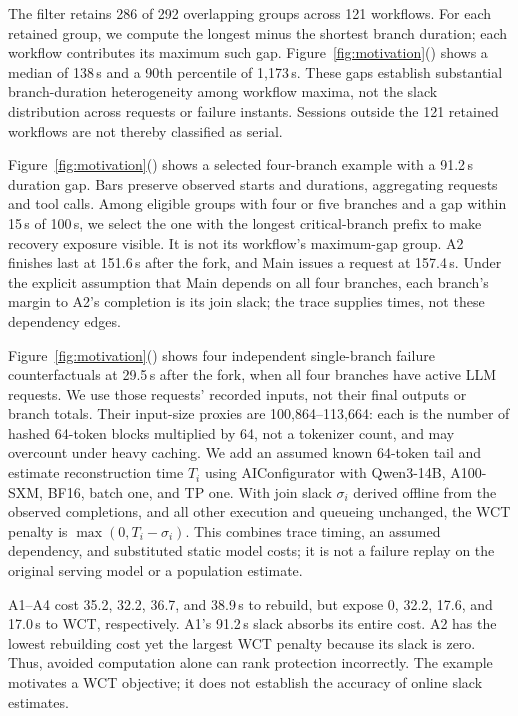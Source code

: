 The filter retains 286 of 292 overlapping groups across 121 workflows.
For each retained group, we compute the longest minus the shortest branch
duration; each workflow contributes its maximum such gap.
Figure~\ref{fig:motivation}() shows a median of
138\,s and a 90th percentile of 1,173\,s. These gaps establish substantial
branch-duration heterogeneity among workflow maxima, not the slack
distribution across requests or failure instants. Sessions outside the
121 retained workflows are not thereby classified as serial.

Figure~\ref{fig:motivation}() shows a
selected four-branch example with a 91.2\,s duration gap. Bars preserve
observed starts and durations, aggregating requests and tool calls.
Among eligible groups with four or five branches and a gap within
15\,s of 100\,s, we select the one with the longest critical-branch prefix
to make recovery exposure visible. It is not its workflow's maximum-gap
group. A2 finishes last at 151.6\,s after the fork, and Main issues a
request at 157.4\,s. Under the explicit assumption that Main depends on
all four branches, each branch's margin to A2's completion is its join
slack; the trace supplies times, not these dependency edges.

Figure~\ref{fig:motivation}() shows
four independent single-branch failure counterfactuals at 29.5\,s after
the fork, when all four branches have active LLM requests. We use those
requests' recorded inputs, not their final outputs or branch totals.
Their input-size proxies are 100,864--113,664: each is the number of
hashed 64-token blocks multiplied by 64, not a tokenizer count, and may
overcount under heavy caching. We add an assumed known 64-token tail
and estimate reconstruction time $T_i$ using
AIConfigurator with Qwen3-14B, A100-SXM, BF16, batch one, and TP one.
With join slack $\sigma_i$ derived offline from the observed completions,
and all other execution and queueing unchanged, the WCT penalty is
$\max(0,T_i-\sigma_i)$. This combines trace timing, an assumed dependency,
and substituted static model costs; it is not a failure replay on the
original serving model or a population estimate.

A1--A4 cost 35.2, 32.2, 36.7, and 38.9\,s to rebuild, but expose
0, 32.2, 17.6, and 17.0\,s to WCT, respectively. A1's 91.2\,s slack
absorbs its entire cost. A2 has the lowest rebuilding cost yet the
largest WCT penalty because its slack is zero. Thus, avoided computation
alone can rank protection incorrectly. The example motivates a WCT
objective; it does not establish the accuracy of online slack estimates.

